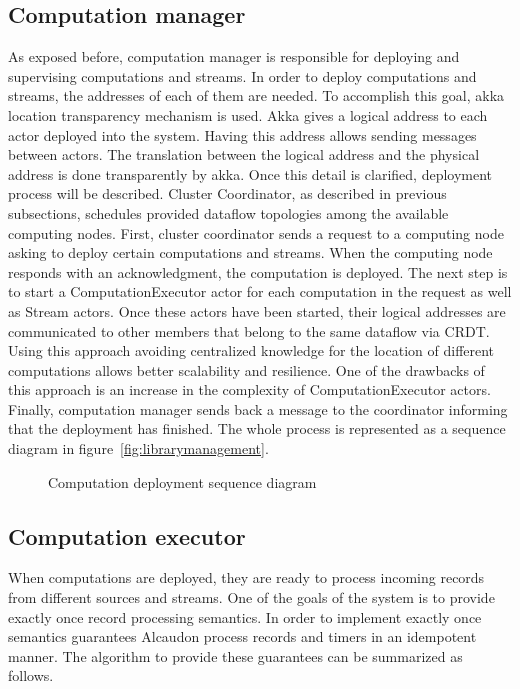\subsection{Computation manager}

As exposed before, computation manager is responsible for deploying and
supervising computations and streams. In order to deploy computations and
streams, the addresses of each of them are needed. To accomplish this
goal, akka location transparency mechanism is used. Akka gives a logical address
to each actor deployed into the system. Having this address allows sending
messages between actors. The translation between the logical address and the
physical address is done transparently by akka. Once this detail is
clarified, deployment process will be described. Cluster Coordinator, as
described in previous subsections, schedules provided dataflow topologies among
the available computing nodes. First, cluster coordinator sends a request to a
computing node asking to deploy certain computations and streams. When the computing
node responds with an acknowledgment, the computation is deployed. The next
step is to start a ComputationExecutor actor for each computation in the request
as well as Stream actors. Once these actors have been started, their logical
addresses are communicated to other members that belong to the same dataflow via
\acs{CRDT}. Using this approach avoiding centralized knowledge for the location
of different computations allows better scalability and resilience. One of the
drawbacks of this approach is an increase in the complexity of ComputationExecutor
actors. Finally, computation manager sends back a message to the coordinator
informing that the deployment has finished. The whole process is represented as
a sequence diagram in figure~\ref{fig:librarymanagement}.

\begin{figure}[!h]
  \centering
  \scalebox{0.45}{
    
  }
  \caption{Computation deployment sequence diagram}
  \label{fig:deployment}
\end{figure}

\subsection{Computation executor}

When computations are deployed, they are ready to process incoming records from
different sources and streams. One of the goals of the system is to provide
exactly once record processing semantics. In order to implement exactly once
semantics guarantees Alcaudon process records and timers in an idempotent
manner. The algorithm to provide these guarantees can be summarized as follows.

